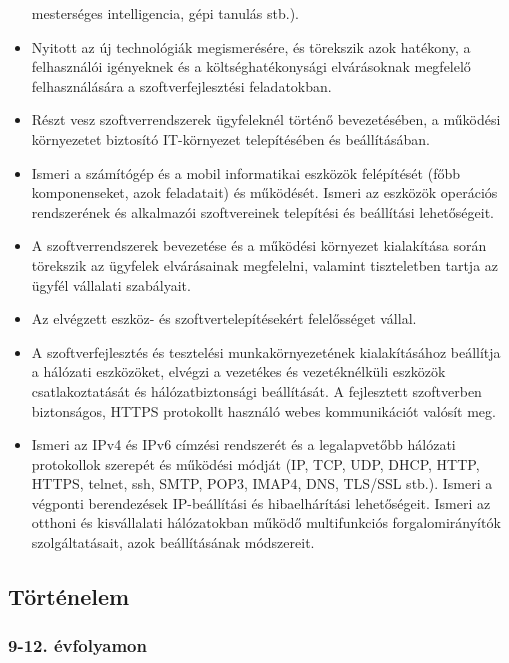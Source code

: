 \begin{itemize}
  mesterséges intelligencia, gépi tanulás stb.).
\item
  Nyitott az új technológiák megismerésére, és törekszik azok hatékony,
  a felhasználói igényeknek és a költséghatékonysági elvárásoknak
  megfelelő felhasználására a szoftverfejlesztési feladatokban.
\item
  Részt vesz szoftverrendszerek ügyfeleknél történő bevezetésében, a
  működési környezetet biztosító IT-környezet telepítésében és
  beállításában.
\item
  Ismeri a számítógép és a mobil informatikai eszközök felépítését (főbb
  komponenseket, azok feladatait) és működését. Ismeri az eszközök
  operációs rendszerének és alkalmazói szoftvereinek telepítési és
  beállítási lehetőségeit.
\item
  A szoftverrendszerek bevezetése és a működési környezet kialakítása
  során törekszik az ügyfelek elvárásainak megfelelni, valamint
  tiszteletben tartja az ügyfél vállalati szabályait.
\item
  Az elvégzett eszköz- és szoftvertelepítésekért felelősséget vállal.
\item
  A szoftverfejlesztés és tesztelési munkakörnyezetének kialakításához
  beállítja a hálózati eszközöket, elvégzi a vezetékes és vezetéknélküli
  eszközök csatlakoztatását és hálózatbiztonsági beállítását. A
  fejlesztett szoftverben biztonságos, HTTPS protokollt használó webes
  kommunikációt valósít meg.
\item
  Ismeri az IPv4 és IPv6 címzési rendszerét és a legalapvetőbb hálózati
  protokollok szerepét és működési módját (IP, TCP, UDP, DHCP, HTTP,
  HTTPS, telnet, ssh, SMTP, POP3, IMAP4, DNS, TLS/SSL stb.). Ismeri a
  végponti berendezések IP-beállítási és hibaelhárítási lehetőségeit.
  Ismeri az otthoni és kisvállalati hálózatokban működő multifunkciós
  forgalomirányítók szolgáltatásait, azok beállításának módszereit.
\end{itemize}

\hypertarget{tortenelem}{%
\subsection{Történelem}\label{tortenelem}}

\hypertarget{evfolyamon-10}{%
\subsubsection{9-12. évfolyamon}\label{evfolyamon-10}}

